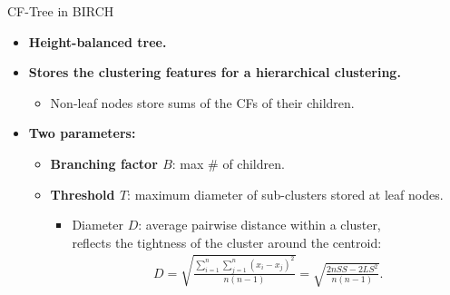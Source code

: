 \begin{frame}{CF-Tree in BIRCH}
	\begin{itemize}
		\item \textbf{Height-balanced tree.}
		\item \textbf{Stores the clustering features for a hierarchical
			      clustering.}
		      \begin{itemize}
			      \item Non-leaf nodes store sums of the CFs of their children.
		      \end{itemize}
		\item \textbf{Two parameters:}
		      \begin{itemize}
			      \item \textbf{\color{airforceblue}Branching factor $B$}: max \# of
			            children.
			      \item \textbf{\color{airforceblue}Threshold $T$}: maximum diameter
			            of sub-clusters stored at leaf nodes.

			            \begin{itemize}

				            \item Diameter $D$: average pairwise distance within a cluster, \\
				                  reflects the tightness of the cluster around the centroid:
				                  \begin{align*}
					                  D = \sqrt{\frac{\sum_{i=1}^{n} \sum_{j=1}^{n}
							                  (x_i-x_j)^2}{n(n-1)}} = \sqrt{\frac{2nSS - 2LS^2}{n(n-1)}}.
				                  \end{align*}

			            \end{itemize}

		      \end{itemize}
	\end{itemize}
\end{frame}

